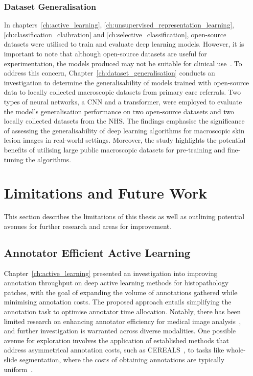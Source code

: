 \subsubsection{Dataset Generalisation}
In chapters~\ref{ch:active_learning}, \ref{ch:unsupervised_representation_learning}, \ref{ch:classification_claibration} and \ref{ch:selective_classification}, open-source datasets were utilised to train and evaluate deep learning models. However, it is important to note that although open-source datasets are useful for experimentation, the models produced may not be suitable for clinical use~\citep{wu2022skin}. To address this concern, Chapter~\ref{ch:dataset_generalisation} conducts an investigation to determine the generalisability of models trained with open-source data to locally collected macroscopic datasets from primary care referrals. Two types of neural networks, a CNN and a transformer, were employed to evaluate the model’s generalisation performance on two open-source datasets and two locally collected datasets from the NHS. The findings emphasise the significance of assessing the generalisability of deep learning algorithms for macroscopic skin lesion images in real-world settings. Moreover, the study highlights the potential benefits of utilising large public macroscopic datasets for pre-training and fine-tuning the algorithms.



\section{Limitations and Future Work}
This section describes the limitations of this thesis as well as outlining potential avenues for further research and areas for improvement.

\subsection{Annotator Efficient Active Learning}
Chapter~\ref{ch:active_learning} presented an investigation into improving annotation throughput on deep active learning methods for histopathology patches, with the goal of expanding the volume of annotations gathered while minimising annotation costs. The proposed approach entails simplifying the annotation task to optimise annotator time allocation. Notably, there has been limited research on enhancing annotator efficiency for medical image analysis~\citep{ren2021survey}, and further investigation is warranted across diverse modalities. One possible avenue for exploration involves the application of established methods that address asymmetrical annotation costs, such as CEREALS~\citep{mackowiak2018cereals}, to tasks like whole-slide segmentation, where the costs of obtaining annotations are typically uniform~\citep{budd2021survey}.

